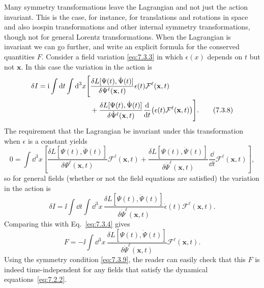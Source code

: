 Many symmetry transformations leave the Lagrangian and not just the action
invariant. This is the case, for instance, for translations and rotations in
space and also isospin transformations and other internal symmetry
transformations, though not for general Lorentz transformations. When the
Lagrangian is invariant we can go further, and write an explicit formula for
the conserved quantities $F$. Consider a field variation \eqref{eq:7.3.3} in which
$\epsilon(x)$ depends on $t$ but not $\mathbf{x}$. In this case the variation in
the action is
\begin{align}
\delta I=\mathrm{i}\int \mathop{}\!\mathrm{d} t\int \mathop{}\!\mathrm{d}^3x\Bigg[&
\frac{\delta L[\Psi(t),\dot\Psi(t)]}{\delta\Psi^\ell(\mathbf{x},t)}
\epsilon(t)\mathcal{F}^\ell(\mathbf{x},t)\notag\\
&+\frac{\delta L[\Psi(t),\dot\Psi(t)]}{\delta\dot\Psi^\ell(\mathbf{x},t)}
\frac{\mathop{}\!\mathrm{d}}{\mathop{}\!\mathrm{d} t}\bigl(\epsilon(t)\mathcal{F}^\ell(\mathbf{x},t)\bigr)\Bigg].
\tag{7.3.8}\label{eq:7.3.8}
\end{align}
The requirement that the Lagrangian be invariant under this transformation
when $\epsilon$ is a constant yields
\begin{equation}
0=\int \dd^3x\left[
\frac{\delta L[\Psi(t),\dot\Psi(t)]}{\delta\Psi^\ell(\mathbf{x},t)}
\mathcal{F}^\ell(\mathbf{x},t)
+\frac{\delta L[\Psi(t),\dot\Psi(t)]}{\delta\dot\Psi^\ell(\mathbf{x},t)}
\frac{\dd}{\dd t}\mathcal{F}^\ell(\mathbf{x},t)\right],
\tag{7.3.9}\label{eq:7.3.9}
\end{equation}
so for general fields (whether or not the field equations are satisfied) the
variation in the action is
\begin{equation}
\delta I=\ii\int \dd t\int \dd^3x\,
\frac{\delta L[\Psi(t),\dot\Psi(t)]}{\delta\dot\Psi^\ell(\mathbf{x},t)}
\dot\epsilon(t)\mathcal{F}^\ell(\mathbf{x},t).
\tag{7.3.10}\label{eq:7.3.10}
\end{equation}
Comparing this with Eq.~\eqref{eq:7.3.4} gives
\begin{equation}
F=-\ii\int \dd^3x\,
\frac{\delta L[\Psi(t),\dot\Psi(t)]}{\delta\dot\Psi^\ell(\mathbf{x},t)}
\mathcal{F}^\ell(\mathbf{x},t).
\tag{7.3.11}\label{eq:7.3.11}
\end{equation}
Using the symmetry condition \eqref{eq:7.3.9}, the reader can easily check that this
$F$ is indeed time-independent for any fields that satisfy the dynamical
equations~\eqref{eq:7.2.2}.

